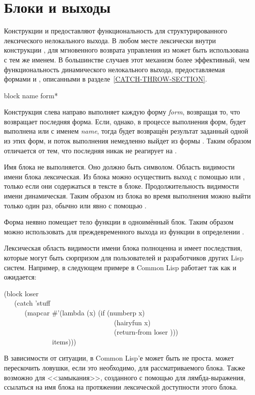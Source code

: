 \section{Блоки и выходы}
\label{BLOCK-RETURN-SECTION}

Конструкции  и  предоставляют функциональность для
структурированного лексического нелокального выхода. В любом месте лексически
внутри конструкции , для мгновенного возврата управления из
 может быть использована  с тем же именем.
В большинстве случаев этот механизм более эффективный, чем функциональность
динамического нелокального выхода, предоставляемая формами  и
, описанными в разделе~\ref{CATCH-THROW-SECTION}.

\begin{defspec}
block name {form}*

Конструкция  слева направо выполняет каждую форму \emph{form},
возвращая то, что возвращает последняя форма.
Если, однако, в процессе выполнения форм, будет выполнена  или
 с именем \emph{name}, тогда будет возвращён результат заданный
одной из этих форм, и поток выполнения немедленно выйдет из формы .
Таким образом  отличается от  тем, что последняя никак не
реагирует на .

Имя блока не выполняется. Оно должно быть символом.
Область видимости имени блока лексическая. Из блока можно осуществить выход с
помощью  или , только если они содержаться в тексте
в блоке. Продолжительность видимости имени динамическая.
Таким образом из блока во время выполнения можно выйти только один раз, обычно
или явно с помощью .

Форма  неявно помещает тело функции в одноимённый блок. 
Таким образом можно использовать  для преждевременного выхода
из функции в определении .

Лексическая область видимости имени блока полноценна и имеет последствия,
которые могут быть сюрпризом для пользователей и разработчиков других Lisp
систем.
Например,  в следующем примере в Common Lisp работает так как
и ожидается:
\begin{lisp}
(block loser \\
~~~(catch 'stuff \\
~~~~~~(mapcar \#'(lambda (x) (if (numberp x) \\
~~~~~~~~~~~~~~~~~~~~~~~~~~~~~~~~(hairyfun x) \\
~~~~~~~~~~~~~~~~~~~~~~~~~~~~~~~~(return-from loser {\nil}))) \\
~~~~~~~~~~~~~~items)))
\end{lisp}
В зависимости от ситуации,  в Common Lisp'е может быть не проста.
 может перескочить ловушки, если это необходимо, для
рассматриваемого блока.
Также возможно для <<замыкания>>, созданного с помощью  для
лямбда-выражения, ссылаться на имя блока на протяжении лексической доступности
этого блока.
\end{defspec}


